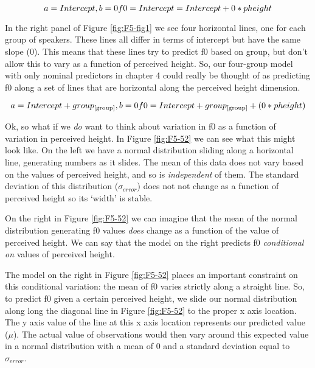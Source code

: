 \documentclass[
]{book}
\begin{document}
\[
a = Intercept, b = 0 \\ \\
f0 = Intercept = Intercept + 0*pheight \\
\label{eq:53}
\]

In the right panel of Figure \ref{fig:F5-fig1} we see four horizontal lines, one for each group of speakers. These lines all differ in terms of intercept but have the same slope (0). This means that these lines try to predict f0 based on group, but don't allow this to vary as a function of perceived height. So, our four-group model with only nominal predictors in chapter 4 could really be thought of as predicting f0 along a set of lines that are horizontal along the perceived height dimension.

\[
a = Intercept + group_{[\mathrm{group}]}, b = 0 \\ \\
f0 = Intercept + group_{[\mathrm{group}]} + (0*pheight) \\
\label{eq:56}
\]

Ok, so what if we \emph{do} want to think about variation in f0 as a function of variation in perceived height. In Figure \ref{fig:F5-52} we can see what this might look like. On the left we have a normal distribution sliding along a horizontal line, generating numbers as it slides. The mean of this data does not vary based on the values of perceived height, and so is \emph{independent} of them. The standard deviation of this distribution (\(\sigma_{error}\)) does not not change as a function of perceived height so its `width' is stable.

On the right in Figure \ref{fig:F5-52} we can imagine that the mean of the normal distribution generating f0 values \emph{does} change as a function of the value of perceived height. We can say that the model on the right predicts f0 \emph{conditional on} values of perceived height.

The model on the right in Figure \ref{fig:F5-52} places an important constraint on this conditional variation: the mean of f0 varies strictly along a straight line. So, to predict f0 given a certain perceived height, we slide our normal distribution along long the diagonal line in Figure \ref{fig:F5-52} to the proper x axis location. The y axis value of the line at this x axis location represents our predicted value (\(\mu\)). The actual value of observations would then vary around this expected value in a normal distribution with a mean of 0 and a standard deviation equal to \(\sigma_{error}\).
\end{document}
